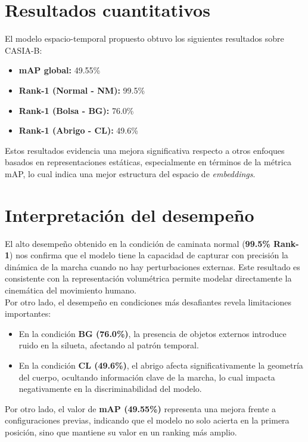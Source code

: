 \section{Resultados cuantitativos}

El modelo espacio-temporal propuesto obtuvo los siguientes resultados sobre CASIA-B:

\begin{itemize}
    \item \textbf{mAP global:} 49.55\%
    \item \textbf{Rank-1 (Normal - NM):} 99.5\%
    \item \textbf{Rank-1 (Bolsa - BG):} 76.0\%
    \item \textbf{Rank-1 (Abrigo - CL):} 49.6\%
\end{itemize}

Estos resultados evidencia una mejora significativa respecto a otros enfoques basados en representaciones estáticas, especialmente en términos de la métrica mAP, lo cual indica una mejor estructura del espacio de \textit{embeddings}.

\section{Interpretación del desempeño}

El alto desempeño obtenido en la condición de caminata normal (\textbf{99.5\% Rank-1}) nos confirma que el modelo tiene la capacidad de capturar con precisión la dinámica de la marcha cuando no hay perturbaciones externas. Este resultado es consistente con la representación volumétrica permite modelar directamente la cinemática del movimiento humano. \\
Por otro lado, el desempeño en condiciones más desafiantes revela limitaciones importantes:

\begin{itemize}
    \item En la condición \textbf{BG (76.0\%)}, la presencia de objetos externos introduce ruido en la silueta, afectando al patrón temporal.
    
    \item En la condición \textbf{CL (49.6\%)}, el abrigo afecta significativamente la geometría del cuerpo, ocultando información clave de la marcha, lo cual impacta negativamente en la discriminabilidad del modelo.
\end{itemize}

Por otro lado, el valor de \textbf{mAP (49.55\%)} representa una mejora frente a configuraciones previas, indicando que el modelo no solo acierta en la primera posición, sino que mantiene su valor en un ranking más amplio.

